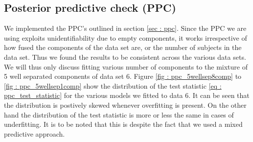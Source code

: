 \subsection{Posterior predictive check (PPC)}
\label{subsec : ppc_simulation}
We implemented the PPC's outlined in section \ref{sec : ppc}. Since the PPC we are using exploits unidentifiability due to empty components, it works irrespective of how fused the components of the data set are, or the number of subjects in the data set. Thus we found the results to be consistent across the various data sets. We will thus only discuss fitting various number of components to the mixture of 5 well separated components of data set 6. Figure \ref{fig : ppc_5wellsep8comp} to \ref{fig : ppc_5wellsep1comp} show the distribution of the test statistic \ref{eq : ppc_test_statistic} for the various models we fitted to data 6. It can be seen that the distribution is postively skewed whenever overfitting is present. On the other hand the distribution of the test statistic is more or less the same in cases of underfitting. It is to be noted that this is despite the fact that we used a mixed predictive approach.\\

